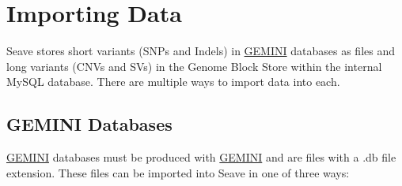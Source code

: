 \documentclass[11pt, a4paper]{article}
\newcommand{\GEMINI}{\href{https://gemini.readthedocs.io}{GEMINI} } %
\begin{document}
\section{Importing Data}

Seave stores short variants (SNPs and Indels) in \GEMINI databases as files and long variants (CNVs and SVs) in the Genome Block Store within the internal MySQL database. There are multiple ways to import data into each.


\subsection{GEMINI Databases}\label{geminiImport}

\GEMINI databases must be produced with \GEMINI and are files with a .db file extension. These files can be imported into Seave in one of three ways:
\end{document}
